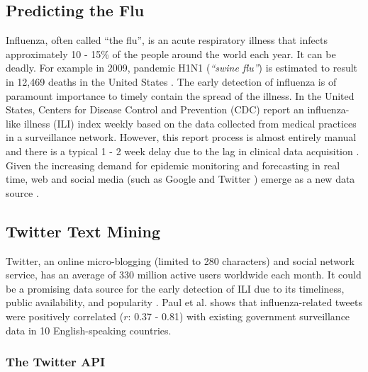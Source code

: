 \documentclass[12pt, oneside]{article}
\begin{document}

\subsection{Predicting the Flu}

Influenza, often called ``the flu'', is an acute respiratory illness that infects approximately 10 - 15\% of the people around the world each year.
It can be deadly. For example in 2009, pandemic H1N1 (\textit{``swine flu''}) is estimated to result in 12,469 deaths in the United States \cite{H1N1}.
The early detection of influenza is of paramount importance to timely contain the spread of the illness. In the United States, Centers for Disease Control and Prevention (CDC)
report an influenza-like illness (ILI) index weekly based on the data collected from medical practices in a surveillance network. However, this report process is almost
entirely manual and there is a typical 1 - 2 week delay due to the lag in clinical data acquisition \cite{TwitterSeasonalFlu}.
Given the increasing demand for epidemic monitoring and forecasting in real time, web and social media (such as Google \cite{GoogleFlu} and Twitter \cite{TwitterFlu})
emerge as a new data source \cite{MediaFlu}.

\subsection{Twitter Text Mining}

Twitter, an online micro-blogging (limited to 280 characters) and social network service, has an average of 330 million active users worldwide \cite{TwitterUser} each month.
It could be a promising data source for the early detection of ILI due to its timeliness, public availability, and popularity \cite{TwitterAnalyzeMessage}.
Paul et al. \cite{TwitterWorldWide} shows that influenza-related tweets were positively correlated ($r$: 0.37 - 0.81) with existing government surveillance data
in 10 English-speaking countries.

\subsubsection{The Twitter API}
\label{subsubsec:api}
\end{document}
